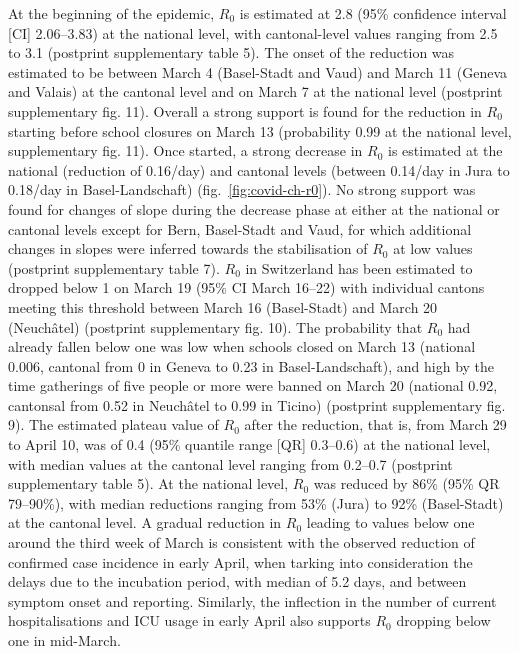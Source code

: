 At the beginning of the epidemic, $R_0$ is estimated at 2.8 (95\% confidence interval [CI] 2.06–3.83) at the national level, with cantonal-level values ranging from 2.5 to 3.1 (postprint supplementary table 5). The onset of the reduction was estimated to be between March 4 (Basel-Stadt and Vaud) and March 11 (Geneva and Valais) at the cantonal level and on March 7 at the national level (postprint supplementary fig. 11). Overall a strong support is found for the reduction in $R_0$ starting before school closures on March 13 (probability 0.99 at the national level, supplementary fig. 11). Once started, a strong decrease in $R_0$ is estimated at the national (reduction of 0.16/day) and cantonal levels (between 0.14/day in Jura to 0.18/day in Basel-Landschaft) (fig.~\ref{fig:covid-ch-r0}). No strong support was found for changes of slope during the decrease phase at either at the national or cantonal levels except for Bern, Basel-Stadt and Vaud, for which additional changes in slopes were inferred towards the stabilisation of $R_0$ at low values (postprint supplementary table 7). $R_0$ in Switzerland has been estimated to dropped below 1 on March 19 (95\% CI March 16–22) with individual cantons meeting this threshold between March 16 (Basel-Stadt) and March 20 (Neuchâtel) (postprint supplementary fig. 10). The probability that $R_0$ had already fallen below one was low when schools closed on March 13 (national 0.006, cantonal from $0$ in Geneva to 0.23 in Basel-Landschaft), and high by the time gatherings of five people or more were banned on March 20 (national 0.92, cantonsal from 0.52 in Neuchâtel to 0.99 in Ticino) (postprint supplementary fig. 9). The estimated plateau value of $R_0$ after the reduction, that is, from March 29 to April 10, was of 0.4 (95\% quantile range [QR] 0.3–0.6) at the national level, with median values at the cantonal level ranging from 0.2–0.7 (postprint supplementary table 5). At the national level, $R_0$ was reduced by 86\% (95\% QR 79–90\%), with median reductions ranging from 53\% (Jura) to 92\% (Basel-Stadt) at the cantonal level. A gradual reduction in $R_0$ leading to values below one around the third week of March is consistent with the observed reduction of confirmed case incidence in early April, when tarking into consideration the delays due to the incubation period, with median of 5.2 days\cite{Lauer:IncubationPeriodCoronavirus:2020}, and between symptom onset and reporting\cite{Bi:EpidemiologyTransmissionCOVID19:2020}. Similarly, the inflection in the number of current hospitalisations and ICU usage in early April also supports $R_0$ dropping below one in mid-March. 

